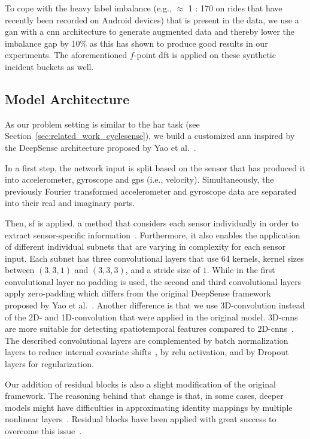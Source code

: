 To cope with the heavy label imbalance (e.g., $\approx$ 1 : 170 on rides that have recently been recorded on Android devices) that is present in the data, we use a \ac{gan} with a \ac{cnn} architecture to generate augmented data and thereby lower the imbalance gap by 10\% as this has shown to produce good results in our experiments.
The aforementioned $f$-point \ac{dft} is applied on these synthetic incident buckets as well.

\subsection{Model Architecture}
\label{subsec:model_architecture}
As our problem setting is similar to the \ac{har} task (see Section~\ref{sec:related_work_cyclesense}), we build a customized \ac{ann} inspired by the DeepSense architecture proposed by Yao et al.~\cite{yao2017deepsense}.

In a first step, the network input is split based on the sensor that has produced it into accelerometer, gyroscope and \ac{gps} (i.e., velocity).
Simultaneously, the previously Fourier transformed accelerometer and gyroscope data are separated into their real and imaginary parts.

Then, \ac{sf} is applied, a method that considers each sensor individually in order to extract sensor-specific information~\cite{elmenreich2002sensor}. 
Furthermore, it also enables the application of different individual subnets that are varying in complexity for each sensor input.
Each subnet has three convolutional layers that use 64 kernels, kernel sizes between $(3,3,1)$ and $(3,3,3)$, and a stride size of $1$.
While in the first convolutional layer no padding is used, the second and third convolutional layers apply zero-padding which differs from the original DeepSense framework proposed by Yao et al.~\cite{yao2017deepsense}. 
Another difference is that we use 3D-convolution instead of the 2D- and 1D-convolution that were applied in the original model. 
3D-\acp{cnn} are more suitable for detecting spatiotemporal features compared to 2D-\acp{cnn}~\cite{tran2015learning}. 
The described convolutional layers are complemented by batch normalization layers to reduce internal covariate shifts~\cite{ioffe2015batch}, by \ac{relu} activation, and by Dropout layers for regularization.

Our addition of residual blocks is also a slight modification of the original framework. 
The reasoning behind that change is that, in some cases, deeper models might have difficulties in approximating identity mappings by multiple nonlinear layers~\cite{he2016deep}. 
Residual blocks have been applied with great success to overcome this issue~\cite{he2016deep}.

